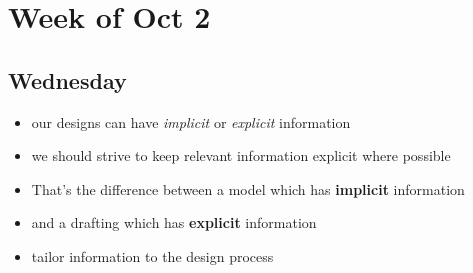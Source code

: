 \documentclass[12pt]{article}
\begin{document}
\tableofcontents
\newpage
\section{Week of Oct 2}
    \subsection{Wednesday}
        \begin{itemize}
            \item our designs can have \textit{implicit} or \textit{explicit} information
            \item we should strive to keep relevant information explicit where possible
            \item That's the difference between a model which has \textbf{implicit} information
            \item and a drafting which has \textbf{explicit} information
            \item tailor information to the design process
        \end{itemize}
\end{document}
